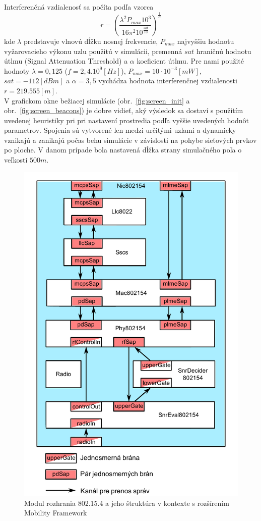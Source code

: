 \indent Interferenčná vzdialenosť sa počíta podľa vzorca $$r=\left(\frac{\lambda^{2}P_{max}10^{3}}{16\pi^{2}10^{\frac{sat}{10}}}\right)^{\frac{1}{\alpha}}$$ kde $\lambda$ predstavuje vlnovú dĺžku nosnej frekvencie, $P_{max}$ najvyššiu hodnotu vyžarovacieho výkonu uzlu použitú v simulácii, premenná $sat$ hraničnú hodnotu útlmu (Signal Attenuation Threshold) a $\alpha$ koeficient útlmu. Pre nami použité hodnoty $\lambda=0,125$ ($f=2,4.10^{9}[Hz]$), $P_{max}=10\cdotp10^{-3}[mW]$, $sat=-112[dBm]$ a $\alpha=3,5$ vychádza hodnota interferenčnej vzdialenosti $r=219.555[m]$.\\
\indent V grafickom okne bežiacej simulácie (obr.~\ref{fig:screen_init} a obr.~\ref{fig:screen_beacons}) je dobre vidieť, aký výsledok sa dostaví s použitím uvedenej heuristiky pri pri nastavení prostredia podľa vyššie uvedených hodnôt parametrov. Spojenia sú vytvorené len medzi určitými uzlami a dynamicky vznikajú a zanikajú počas behu simulácie v závislosti na pohybe sieťových prvkov po ploche. V danom prípade bola nastavená dĺžka strany simulačného poľa o veľkosti $500m$.\\
\begin{figure}[htbp]
\begin{center}
\includegraphics[width=120mm]{figures/architecture_nic}
\caption{Modul rozhrania 802.15.4 a jeho štruktúra v kontexte s rozšírením Mobility Framework}
\label{fig:architecture_nic}
\end{center}
\end{figure}

